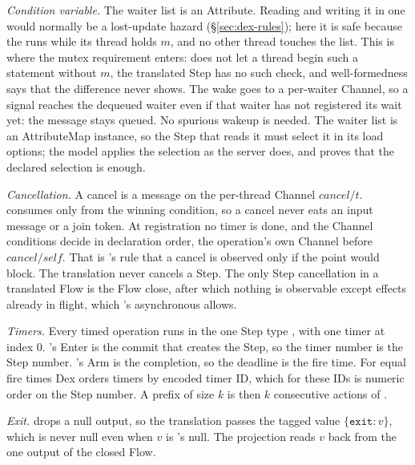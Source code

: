 \emph{Condition variable.} The waiter list is an Attribute. Reading and
writing it in one  would normally be a lost-update hazard
(\S\ref{sec:dex-rules}); here it is safe because the  runs
while its thread holds $m$, and no other thread touches the list. This is
where the mutex requirement enters: \Lang{} does not let a thread begin
such a statement without $m$, the translated Step has no such check, and
well-formedness says that the difference never shows. The wake goes to a
per-waiter Channel, so a signal reaches the dequeued waiter even if that
waiter has not registered its wait yet: the message stays queued. No
spurious wakeup is needed. The waiter list is an AttributeMap instance, so
the Step that reads it must select it in its load options; the model
applies the selection as the server does, and
 proves that the declared selection
is enough.

\emph{Cancellation.} A cancel is a message on the per-thread Channel
$\mathit{cancel}/t$.  consumes only from the winning condition,
so a cancel never eats an input message or a join token. At registration no
timer is done, and the Channel conditions decide in declaration order, the
operation's own Channel before $\mathit{cancel}/\mathit{self}$. That is
\Lang{}'s rule that a cancel is observed only if the point would block. The
translation never cancels a Step. The only Step cancellation in a
translated Flow is the Flow close, after which nothing is observable except
effects already in flight, which \Lang{}'s asynchronous  allows.

\emph{Timers.} Every timed operation runs in the one Step type
, with one timer at index 0. \Lang{}'s Enter is the commit that
creates the Step, so the timer number is the Step number. \Lang{}'s Arm is
the  completion, so the deadline is the fire time. For equal
fire times Dex orders timers by encoded timer ID, which for these IDs is
numeric order on the Step number. A  prefix of size
$k$ is then $k$ consecutive  actions of \Lang{}.

\emph{Exit.}  drops a null output, so the translation
passes the tagged value $\{\texttt{exit}: v\}$, which is never null even
when $v$ is \Lang{}'s null. The projection reads $v$ back from the one
output of the closed Flow.
